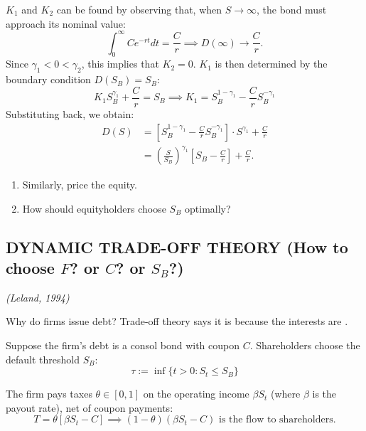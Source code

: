 $K_1$ and $K_2$ can be found by observing that, when $S \to \infty$, the bond must approach its nominal value:
\begin{equation*}
    \int_0^\infty C e^{-rt} dt = \frac{C}{r} \implies D(\infty) \to \frac{C}{r}.
\end{equation*}
Since $\gamma_1 < 0 < \gamma_2$, this implies that $K_2 = 0$. $K_1$ is then determined by the boundary condition $D(S_B) = S_B$:
\begin{equation*}
    K_1 S_B^{\gamma_1} + \frac{C}{r} = S_B \implies K_1 = S_B^{1-\gamma_1} - \frac{C}{r} S_B^{-\gamma_1}
\end{equation*}
Substituting back, we obtain:
\begin{align*}
    D(S) &= \left[ S_B^{1-\gamma_1} - \frac{C}{r} S_B^{-\gamma_1} \right] \cdot S^{\gamma_1} + \frac{C}{r} \\
    &= \left( \frac{S}{S_B} \right)^{\gamma_1} \left[ S_B - \frac{C}{r} \right] + \frac{C}{r}.
\end{align*}

\begin{homework*}
    \begin{enumerate}
        \item Similarly, price the equity.
        \item How should equityholders choose $S_B$ optimally?
    \end{enumerate}
\end{homework*}

\subsection*{\color{red}DYNAMIC TRADE-OFF THEORY (How to choose $F$? or $C$? or $S_B$?)}
\textit{(Leland, 1994)}

Why do firms issue debt? Trade-off theory says it is because the interests are .

Suppose the firm's debt is a consol bond with coupon $C$. Shareholders choose the default threshold $S_B$:
\begin{equation*}
    \tau := \inf \{t > 0 : S_t \leq S_B\}
\end{equation*}

The firm pays taxes $\theta \in [0,1]$ on the operating income $\beta S_t$ (where $\beta$ is the payout rate), net of coupon payments:
\begin{equation*}
    T = \theta [\beta S_t - C] \implies (1-\theta)(\beta S_t - C) \text{ is the flow to shareholders.}
\end{equation*}

